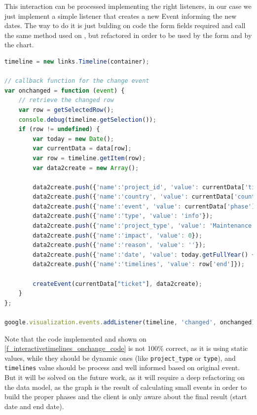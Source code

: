 This interaction can be processed implementing the right listeners, in our case
we just implement a simple listener that creates a new Event informing the new
dates. The way to do it is just bulding on code the form fields required and
call the same method used on , but
refactored in order to be used by the form and by the chart.
\newpage
\begin{lstlisting}[language=Javascript,breaklines=true,caption=CHAP On\
change\ event,label=f_interactivetimelines_onchange_code] 
timeline = new links.Timeline(container);
	
// callback function for the change event
var onchanged = function (event) {
    // retrieve the changed row
    var row = getSelectedRow();
    console.debug(timeline.getSelection());
    if (row != undefined) {
        var today = new Date();
        var currentData = data[row];
        var row = timeline.getItem(row);
        var data2create = new Array();
        
        data2create.push({'name':'project_id', 'value': currentData['ticket']});
        data2create.push({'name':'country', 'value': currentData['country']});
        data2create.push({'name':'event', 'value': currentData['phase']});
        data2create.push({'name':'type', 'value': 'info'});
        data2create.push({'name':'project_type', 'value': 'Maintenance'});
        data2create.push({'name':'impact', 'value': 0});
        data2create.push({'name':'reason', 'value': ''});
        data2create.push({'name':'date', 'value': today.getFullYear() +"-"+ today.getMonth()+1 +"-"+ today.getDate()});
        data2create.push({'name':'timelines', 'value': row['end']});
        
        createEvent(currentData["ticket"], data2create);
    }
};

google.visualization.events.addListener(timeline, 'changed', onchanged);
\end{lstlisting} 

Note that the code implemented and shown on \ref{f_interactivetimelines_onchange_code} is not 100\% correct, as
it is using static values, while they should be dynamic ones (like \texttt{project\_type} or
\texttt{type}), and \texttt{timelines} value should be process and well informed
based on original event. But it will be solved on the future work, as it will
require a deep refactoring on the data model, as the graph is the result of
calculating small events in order to build the proper phases and the client is
only aware about the final result (start date and end date).


